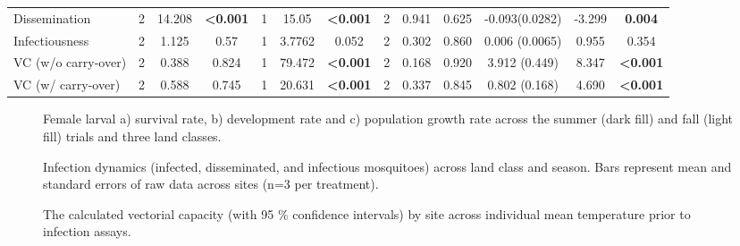 \documentclass[12pt]{article}
\begin{document}
\begin{landscape}
\begin{table}[]
\begin{tabular}{l|ccc|ccc|ccc|ccc}
Dissemination               & 2           & 14.208    & \textbf{\textless0.001} & 1           & 15.05     & \textbf{\textless0.001} & 2           & 0.941     & 0.625                   & -0.093(0.0282)   & -3.299  & \textbf{0.004}          \\
Infectiousness              & 2           & 1.125     & 0.57                    & 1           & 3.7762    & 0.052                   & 2           & 0.302     & 0.860                   & 0.006 (0.0065)   & 0.955   & 0.354                   \\
VC (w/o carry-over)         & 2           & 0.388     & 0.824                   & 1           & 79.472    & \textbf{\textless0.001} & 2           & 0.168     & 0.920                   & 3.912 (0.449)    & 8.347   & \textbf{\textless0.001} \\
VC (w/ carry-over)          & 2           & 0.588     & 0.745                   & 1           & 20.631    & \textbf{\textless0.001} & 2           & 0.337     & 0.845                   & 0.802 (0.168)    & 4.690   & \textbf{\textless0.001} \\
\end{tabular}
\end{table}

\end{landscape}

\begin{figure}
\centering
\caption{Female larval a) survival rate, b) development rate and c) population growth rate across the summer (dark fill) and fall (light fill) trials and three land classes.}
\label{fig:growth}
\end{figure}

\begin{figure}
\centering
\caption{Infection dynamics (infected, disseminated, and infectious mosquitoes) across land class and season. Bars represent mean and standard errors of raw data across sites (n=3 per treatment).}
\label{Fig:Infxclass}
\end{figure}

\begin{figure}
\centering
\caption{The calculated vectorial capacity (with 95 \% confidence intervals) by site across individual mean temperature prior to infection assays.}
\label{Fig:VC}
\end{figure}
\end{document}
